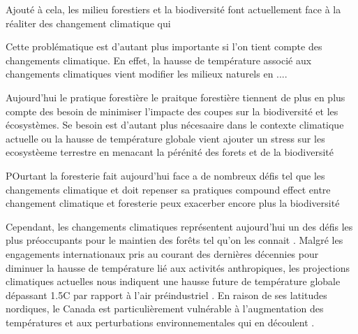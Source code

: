     Ajouté à cela, les milieu forestiers et la biodiversité font actuellement face à la réaliter des changement climatique qui 

Cette problématique est d'autant plus importante si l'on tient compte des changements climatique. 
En effet, la hausse de température associé aux changements climatiques vient modifier les milieux naturels en ....


Aujourd'hui le pratique forestière le praitque forestière tiennent de plus en plus compte des besoin de minimiser l'impacte des coupes sur la biodiversité et les écosystèmes.
Se besoin est d'autant plus nécesaaire dans le contexte climatique actuelle ou la hausse de température globale vient ajouter un stress sur les ecosystèeme terrestre en menacant la pérénité des forets et de la biodiversité

POurtant la foresterie fait aujourd'hui face a de nombreux défis tel que les changements climatique et doit repenser sa pratiques
compound effect entre changement climatique et foresterie peux exacerber encore plus la biodiversité

Cependant, les changements climatiques représentent aujourd'hui un des défis les plus préoccupants pour le maintien des forêts tel qu'on les connait \citep{McKenney2009Climatechange,Trumbore2015Foresthealth,Seidl2017Forestdisturbances,Messier2022Warningnatural}.  
Malgré les engagements internationaux pris au courant des dernières décennies pour diminuer la hausse de température lié aux activités anthropiques, 
les projections climatiques actuelles nous indiquent une hausse future de température globale dépassant 1.5C par rapport à l'air préindustriel \citep{Matthews2022Currentglobal}.
En raison de ses latitudes nordiques, le Canada est particulièrement vulnérable à l'augmentation des températures et aux perturbations environnementales qui en découlent \citep{Alo2008Potentialfuture,Bush2019Canadachanging}. 

